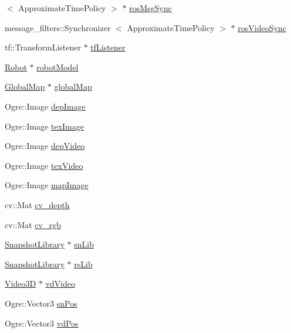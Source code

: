 \begin{DoxyCompactItemize}
$<$ \-Approximate\-Time\-Policy $>$ $\ast$ \hyperlink{classBaseApplication_a61075324a878878f31706cd03eac163e}{ros\-Msg\-Sync}
\item 
message\-\_\-filters\-::\-Synchronizer\*
$<$ \-Approximate\-Time\-Policy $>$ $\ast$ \hyperlink{classBaseApplication_a40d9d7bce284716b4f58e5ebf596104b}{ros\-Video\-Sync}
\item 
tf\-::\-Transform\-Listener $\ast$ \hyperlink{classBaseApplication_afed20466bdf46149a1bcad505a3e8022}{tf\-Listener}
\item 
\hyperlink{classRobot}{\-Robot} $\ast$ \hyperlink{classBaseApplication_a884bd9efccf3e8ab710ac74a1a819e69}{robot\-Model}
\item 
\hyperlink{classGlobalMap}{\-Global\-Map} $\ast$ \hyperlink{classBaseApplication_a2f5e751177a5e6d87593fa208ea7ffa3}{global\-Map}
\item 
\-Ogre\-::\-Image \hyperlink{classBaseApplication_a0b2012a7ec70e1b7583b89f40c657320}{dep\-Image}
\item 
\-Ogre\-::\-Image \hyperlink{classBaseApplication_a91123c8ea1b0c3e1562e64b7879de5e4}{tex\-Image}
\item 
\-Ogre\-::\-Image \hyperlink{classBaseApplication_a5851500faacd7d3792ce7a6f6184888e}{dep\-Video}
\item 
\-Ogre\-::\-Image \hyperlink{classBaseApplication_ab70dda7e59099d2309d9fdd4bf11c53a}{tex\-Video}
\item 
\-Ogre\-::\-Image \hyperlink{classBaseApplication_a254410dc2906d4860d66d085f7217ace}{map\-Image}
\item 
cv\-::\-Mat \hyperlink{classBaseApplication_a48295806a980665f17d787215c5f90c6}{cv\-\_\-depth}
\item 
cv\-::\-Mat \hyperlink{classBaseApplication_ad21a1772f66fec18c20a2924ad943d1b}{cv\-\_\-rgb}
\item 
\hyperlink{classSnapshotLibrary}{\-Snapshot\-Library} $\ast$ \hyperlink{classBaseApplication_a51cd2f82fb21d523d6940f5f557b2dff}{sn\-Lib}
\item 
\hyperlink{classSnapshotLibrary}{\-Snapshot\-Library} $\ast$ \hyperlink{classBaseApplication_a804cbbaeae6ea76b47fce0692460451b}{rs\-Lib}
\item 
\hyperlink{classVideo3D}{\-Video3\-D} $\ast$ \hyperlink{classBaseApplication_a3768ce4e283c7cc09b78adba043024be}{vd\-Video}
\item 
\-Ogre\-::\-Vector3 \hyperlink{classBaseApplication_a7762b8555eb6aabd8687b34fafae2405}{sn\-Pos}
\item 
\-Ogre\-::\-Vector3 \hyperlink{classBaseApplication_adec41f9fd119d45e6594749a0147334d}{vd\-Pos}

\end{DoxyCompactItemize}
